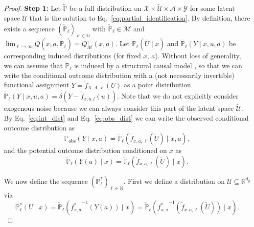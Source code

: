 \documentclass{article} %
\newcommand{\R}{\mathbb{R}}
\newcommand{\N}{\mathbb{N}}
\theoremstyle{definition}
\theoremstyle{plain}
\begin{document}
\begin{proof}
\textbf{Step 1:} Let $\widetilde{\mathbb{P}}$ be a full distribution on $\mathcal{X} \times \widetilde{\mathcal{U}} \times \mathcal{A} \times \mathcal{Y}$ for some latent space $\widetilde{\mathcal{U}}$ that is the solution to Eq.~\eqref{eq:partial_identification}. By definition, there exists a sequence $(\widetilde{\mathbb{P}}_\ell)_{\ell \in \N}$ with $\widetilde{\mathbb{P}}_\ell \in \mathcal{M}$ and
$\lim_{{\ell \to \infty}} Q(x, a, \widetilde{\mathbb{P}}_\ell) = Q^+_\mathcal{M}(x, a)$. Let $\widetilde{\mathbb{P}}_\ell(\widetilde{U} \mid x)$ and $\widetilde{\mathbb{P}}_\ell(Y \mid x, u, a)$ be corresponding induced distributions (for fixed $x$, $a$). Without loss of generality, we can assume that $\widetilde{\mathbb{P}}_\ell$ is induced by a structural causal model \citep{Pearl.2009}, so that we can write the conditional outcome distribution with a (not necessarily invertible) functional assignment $Y = \widetilde{f}_{X, A, \ell}(U)$ as a point distribution $\widetilde{\mathbb{P}}_\ell(Y \mid x, u, a) = \delta(Y - \widetilde{f}_{x, a, l}(u))$. Note that we do not explicitly consider exogenous noise because we can always consider this part of the latent space $\widetilde{\mathcal{U}}$. By Eq.~\eqref{eq:int_dist} and Eq.~\eqref{eq:obs_dist} we can write the observed conditional outcome distribution as
\begin{equation}\label{eq:proof_tilde_obs}
\mathbb{P}_\mathrm{obs}(Y \mid x, a) = \widetilde{\mathbb{P}}_\ell(\widetilde{f}_{x, a, \ell}(\widetilde{U}) \mid x, a),  
\end{equation}
and the potential outcome distribution conditioned on $x$ as 
\begin{equation}
\widetilde{\mathbb{P}}_\ell(Y(a) \mid x) = \widetilde{\mathbb{P}}_\ell(\widetilde{f}_{x, a, \ell}(\widetilde{U}) \mid x).
\end{equation}

We now define the sequence $(\mathbb{P}_\ell^\ast)_{\ell \in \N}$. First we define a distribution on $\mathcal{U} \subseteq \R^{d_y}$ via
\begin{equation}\label{eq:proof_defp}
\mathbb{P}_\ell^\ast(U \mid x) = \widetilde{\mathbb{P}}_\ell({f^\ast_{x, a}}^{-1} \left(Y(a) \right)\mid x) = \widetilde{\mathbb{P}}_\ell({f^\ast_{x, a}}^{-1} \left(\widetilde{f}_{x, a, \ell}(\widetilde{U}) \right)\mid x).
\end{equation}


\end{proof}
\end{document}
